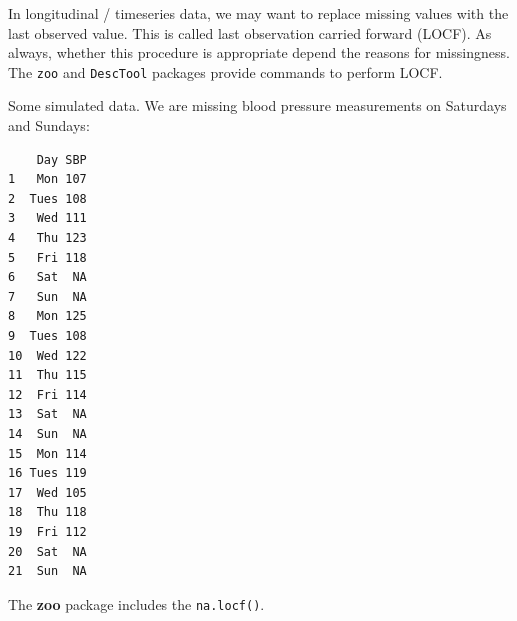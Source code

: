\documentclass[
]{book}
\newenvironment{Shaded}{\begin{snugshade}}{\end{snugshade}}
\newcommand{\AttributeTok}[1]{\textcolor[rgb]{0.77,0.63,0.00}{#1}}
\newcommand{\ConstantTok}[1]{\textcolor[rgb]{0.00,0.00,0.00}{#1}}
\newcommand{\DecValTok}[1]{\textcolor[rgb]{0.00,0.00,0.81}{#1}}
\newcommand{\FunctionTok}[1]{\textcolor[rgb]{0.00,0.00,0.00}{#1}}
\newcommand{\NormalTok}[1]{#1}
\newcommand{\OtherTok}[1]{\textcolor[rgb]{0.56,0.35,0.01}{#1}}
\newcommand{\SpecialCharTok}[1]{\textcolor[rgb]{0.00,0.00,0.00}{#1}}
\newcommand{\StringTok}[1]{\textcolor[rgb]{0.31,0.60,0.02}{#1}}
\begin{document}
In longitudinal / timeseries data, we may want to replace missing values with the last observed value. This is called last observation carried forward (LOCF). As always, whether this procedure is appropriate depend the reasons for missingness. The \texttt{zoo} and \texttt{DescTool} packages provide commands to perform LOCF.

Some simulated data. We are missing blood pressure measurements on Saturdays and Sundays:

\begin{Shaded}
\end{Shaded}

\begin{verbatim}
    Day SBP
1   Mon 107
2  Tues 108
3   Wed 111
4   Thu 123
5   Fri 118
6   Sat  NA
7   Sun  NA
8   Mon 125
9  Tues 108
10  Wed 122
11  Thu 115
12  Fri 114
13  Sat  NA
14  Sun  NA
15  Mon 114
16 Tues 119
17  Wed 105
18  Thu 118
19  Fri 112
20  Sat  NA
21  Sun  NA
\end{verbatim}

The \textbf{zoo} package includes the \texttt{na.locf()}.

\begin{Shaded}
\end{Shaded}
\end{document}
